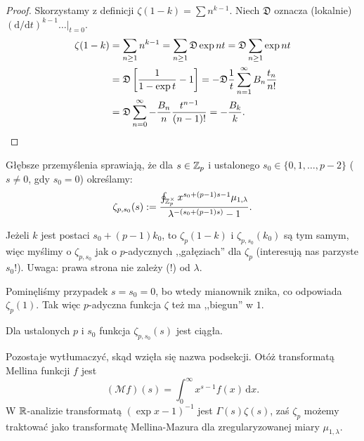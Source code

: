 \begin{proof}
	Skorzystamy z definicji $\zeta(1 - k) = \sum n^{k-1}$. Niech $\mathfrak D$ oznacza (lokalnie) $(\textrm{d}/ \textrm{d}t)^{k-1} \left. \ldots \right|_{t = 0}$.
	\begin{align*}
		\zeta(1-k) & = \sum_{n \ge 1} n^{k-1} = \sum_{n \ge 1} \mathfrak D \exp nt = \mathfrak D \sum_{n \ge 1} \exp nt \\
		& = \mathfrak D \left[\frac{1}{1 - \exp t} - 1\right] = - \mathfrak D \frac 1 t \sum_{n = 1}^\infty B_n \frac{t_n}{n!} \\
		& = \mathfrak D \sum_{n=0}^\infty - \frac{B_n} n \frac{t^{n-1}}{(n-1)!} = - \frac{B_k}k. \qedhere
	\end{align*}
\end{proof}

Głębsze przemyślenia sprawiają, że dla $s \in \mathbb Z_p$ i ustalonego $s_0 \in \{0, 1, \dots, p-2\}$ ($s \neq 0$, gdy $s_0 = 0$) określamy:
\[
	\zeta_{p, s_0}(s) := \frac{\oint_{\mathbb Z_p^\times} x^{s_0 + (p-1)s-1} \mu_{1,\lambda}}{\lambda^{-(s_0 + (p-1)s)}-1}.
\]

Jeżeli $k$ jest postaci $s_0 + (p-1)k_0$, to $\zeta_p(1-k)$ i $\zeta_{p,s_0}(k_0)$ są tym samym, więc myślimy o $\zeta_{p, s_0}$ jak o $p$-adycznych ,,gałęziach'' dla $\zeta_p$ (interesują nas parzyste $s_0$!).
Uwaga: prawa strona nie zależy (!) od $\lambda$.

Pominęliśmy przypadek $s = s_0 = 0$, bo wtedy mianownik znika, co odpowiada $\zeta_p(1)$.
Tak więc $p$-adyczna funkcja $\zeta$ też ma ,,biegun'' w $1$.

\begin{fakt}
	Dla ustalonych $p$ i $s_0$ funkcja $\zeta_{p,s_0}(s)$ jest ciągła. %
\end{fakt}

Pozostaje wytłumaczyć, skąd wzięła się nazwa podsekcji.
Otóż transformatą Mellina funkcji $f$ jest
\[
	(\mathcal M f)(s) = \int_0^\infty x^{s-1} f(x)\,\textrm{d}x.
\]
W $\mathbb R$-analizie transformatą $(\exp x - 1)^{-1}$ jest $\Gamma(s) \zeta(s)$, zaś $\zeta_p$ możemy traktować jako transformatę Mellina-Mazura dla zregularyzowanej miary $\mu_{1, \lambda}$.